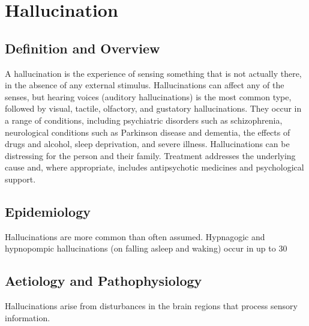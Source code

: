 \chapter{Hallucination}

\section*{Definition and Overview}
A hallucination is the experience of sensing something that is not actually there, in the absence of any external stimulus. Hallucinations can affect any of the senses, but hearing voices (auditory hallucinations) is the most common type, followed by visual, tactile, olfactory, and gustatory hallucinations. They occur in a range of conditions, including psychiatric disorders such as schizophrenia, neurological conditions such as Parkinson disease and dementia, the effects of drugs and alcohol, sleep deprivation, and severe illness. Hallucinations can be distressing for the person and their family. Treatment addresses the underlying cause and, where appropriate, includes antipsychotic medicines and psychological support.

\section*{Epidemiology}
Hallucinations are more common than often assumed. Hypnagogic and hypnopompic hallucinations (on falling asleep and waking) occur in up to 30%

\section*{Aetiology and Pathophysiology}
Hallucinations arise from disturbances in the brain regions that process sensory information.

